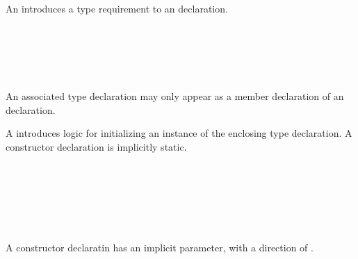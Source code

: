 
An  introduces a type requirement to an  declaration.

\begin{Syntax}
     \\
          \\
        \SynOpt \\
        \SynOpt \\
        \SynOpt \code{;}
\end{Syntax}

An associated type declaration may only appear as a member declaration of an  declaration.



A  introduces logic for initializing an instance of the enclosing type declaration.
A constructor declaration is implicitly static.

\begin{Syntax}
     \\
         \\
        \SynOpt \\
         \\
         \\
\end{Syntax}

A constructor declaratin has an implicit  parameter, with a direction of .



